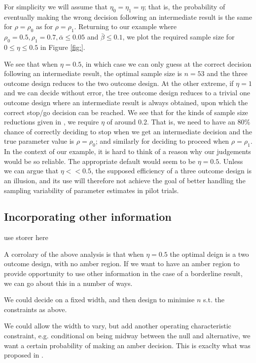 \documentclass[sagev, Crown]{sagej} %
\begin{document}
For simplicity we will assume that $\eta_0 = \eta_1 = \eta$; that is, the probability of eventually making the wrong decision following an intermediate result is the same for $\rho = \rho_0$ as for $\rho = \rho_1$. Returning to our example where $\rho_0 = 0.5, \rho_1 = 0.7, \bar{\alpha} \leq 0.05$ and $\bar{\beta} \leq 0.1$, we plot the required sample size for $0 \leq \eta \leq 0.5$ in Figure \ref{fig:}. 

We see that when $\eta = 0.5$, in which case we can only guess at the correct decision following an intermediate result, the optimal sample size is $n = 53$ and the three outcome design reduces to the two outcome design. At the other extreme, if $\eta = 1$ and we can decide without error, the tree outcome design reduces to a trivial one outcome design where an intermediate result is always obtained, upon which the correct stop/go decision can be reached. We see that for the kinds of sample size reductions given in \cite{Sargent2001}, we require $\eta$ of around 0.2. That is, we need to have an 80\% chance of correctly deciding to stop when we get an intermediate decision and the true parameter value is $\rho = \rho_0$; and similarly for deciding to proceed when $\rho = \rho_1$. In the context of our example, it is hard to think of a reason why our judgements would be so reliable. The appropriate default would seem to be $\eta = 0.5$. Unless we can argue that $\eta << 0.5$, the supposed efficiency of a three outcome design is an illusion, and its use will therefore not achieve the goal of better handling the sampling variability of parameter estimates in pilot trials.

\subsection{Incorporating other information}

use storer here

A corrolary of the above analysis is that when $\eta = 0.5$ the optimal deign is a two outcome design, with no amber region. If we want to have an amber region to provide opportunity to use other information in the case of a borderline result, we can go about this in a number of ways. 

We could decide on a fixed width, and then design to minimise $n$ s.t. the constraints as above.

We could allow the width to vary, but add another operating characteristic constraint, e.g. conditional on being midway between the null and alternative, we want a certain probability of making an amber decision. This is exaclty what was proposed in \cite{Storer1992}.
\end{document}
